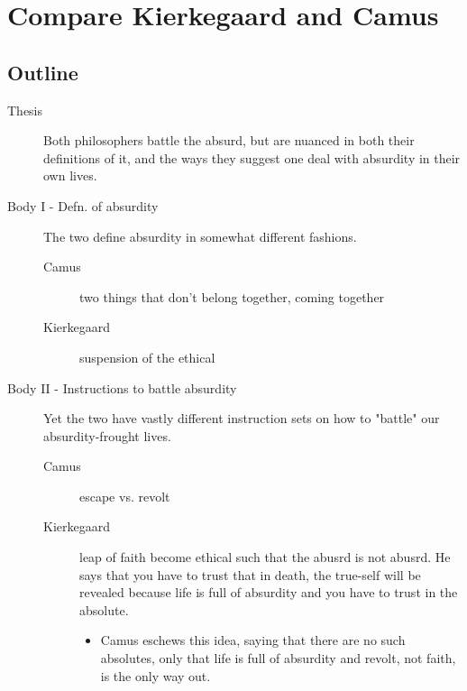 \section{Compare Kierkegaard and Camus}
\subsection{Outline}
\begin{description}
  \item[Thesis] Both philosophers battle the absurd, but are nuanced in both
    their definitions of it, and the ways they suggest one deal with absurdity
    in their own lives.
  \item[Body I - Defn. of absurdity] The two define absurdity in somewhat
    different fashions.
    \begin{description}
      \item[Camus] two things that don't belong together, coming together
      \item[Kierkegaard] suspension of the ethical
    \end{description}
  \item[Body II - Instructions to battle absurdity] Yet the two have vastly
    different instruction sets on how to "battle" our absurdity-frought lives.
    \begin{description}
      \item[Camus] escape vs. revolt
      \item[Kierkegaard] leap of faith become ethical such that the abusrd is
        not abusrd. He says that you have to trust that in death, the true-self
        will be revealed because life is full of absurdity and you have to trust
        in the absolute.
        \begin{itemize}
          \item Camus eschews this idea, saying that there are no such
            absolutes, only that life is full of absurdity and revolt, not
            faith, is the only way out.
        \end{itemize}
    \end{description}
\end{description}
